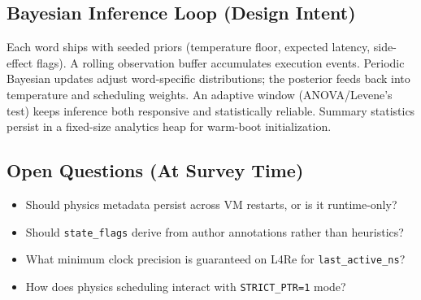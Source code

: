 \subsection{Bayesian Inference Loop (Design Intent)}

Each word ships with seeded priors (temperature floor, expected latency,
side-effect flags). A rolling observation buffer accumulates execution events.
Periodic Bayesian updates adjust word-specific distributions; the posterior
feeds back into temperature and scheduling weights. An adaptive window
(ANOVA/Levene's test) keeps inference both responsive and statistically
reliable. Summary statistics persist in a fixed-size analytics heap for
warm-boot initialization.

\subsection{Open Questions (At Survey Time)}

\begin{itemize}
  \item Should physics metadata persist across VM restarts, or is it
        runtime-only?
  \item Should \texttt{state\_flags} derive from author annotations rather
        than heuristics?
  \item What minimum clock precision is guaranteed on L4Re for
        \texttt{last\_active\_ns}?
  \item How does physics scheduling interact with \texttt{STRICT\_PTR=1}
        mode?
\end{itemize}
